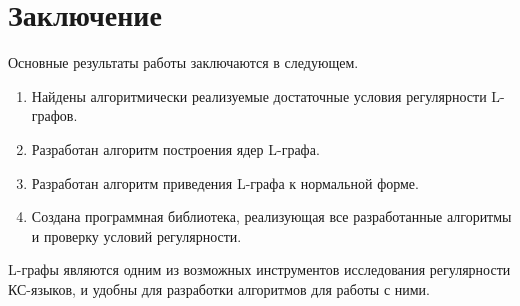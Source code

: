 \chapter*{Заключение}						%

Основные результаты работы заключаются в следующем.
\begin{enumerate}
  \item Найдены алгоритмически реализуемые достаточные условия регулярности L-графов.
  \item Разработан алгоритм построения ядер L-графа.
  \item Разработан алгоритм приведения L-графа к нормальной форме.
  \item Создана программная библиотека, реализующая все разработанные алгоритмы и проверку условий регулярности.
\end{enumerate}
L-графы являются одним из возможных инструментов исследования регулярности КС-языков, 
и удобны для разработки алгоритмов для работы с ними.
\clearpage